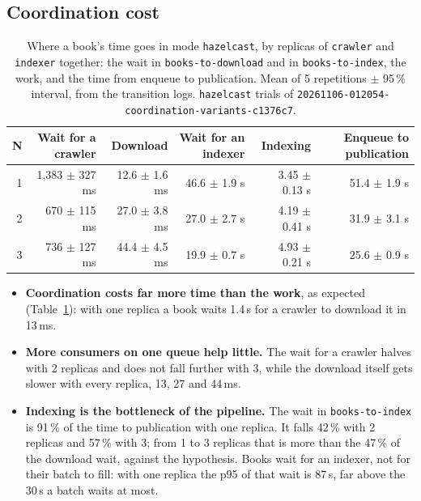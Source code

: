 \documentclass[11pt,a4paper]{article}
\newcommand{\code}[1]{\nolinkurl{#1}}
\newcommand{\mode}[1]{\code{#1}}
\newcommand{\run}[1]{\nolinkurl{#1}}
\begin{document}
\subsection{Coordination cost}
\label{sec:coordcost}

\begin{table}[ht]
\centering
\small
\caption{Where a book's time goes in mode \mode{hazelcast}, by replicas of \code{crawler} and \code{indexer} together:
the wait in \code{books-to-download} and in \code{books-to-index}, the work, and the time from enqueue to publication.
Mean of 5 repetitions $\pm$ 95\,\% interval,
from the transition logs. \mode{hazelcast} trials of \run{20261106-012054-coordination-variants-c1376c7}.}
\label{tab:coordination}
\footnotesize
\setlength{\tabcolsep}{4pt}
\begin{tabular}{@{}rrrrrr@{}}
\toprule
N & Wait for a crawler & Download & Wait for an indexer & Indexing & Enqueue to publication \\
\midrule
1 & 1{,}383 $\pm$ 327 ms & 12.6 $\pm$ 1.6 ms & 46.6 $\pm$ 1.9 s & 3.45 $\pm$ 0.13 s & 51.4 $\pm$ 1.9 s \\
2 & 670 $\pm$ 115 ms & 27.0 $\pm$ 3.8 ms & 27.0 $\pm$ 2.7 s & 4.19 $\pm$ 0.41 s & 31.9 $\pm$ 3.1 s \\
3 & 736 $\pm$ 127 ms & 44.4 $\pm$ 4.5 ms & 19.9 $\pm$ 0.7 s & 4.93 $\pm$ 0.21 s & 25.6 $\pm$ 0.9 s \\
\bottomrule
\end{tabular}
\end{table}

\begin{itemize}
\item \textbf{Coordination costs far more time than the work}, as expected (Table~\ref{tab:coordination}): with one
  replica a book waits 1.4\,s for a crawler to download it in 13\,ms.
\item \textbf{More consumers on one queue help little.} The wait for a crawler halves with 2 replicas and does not fall
  further with 3, while the download itself gets slower with every replica, 13, 27 and 44\,ms.
\item \textbf{Indexing is the bottleneck of the pipeline.} The wait in \code{books-to-index} is 91\,\% of the time to
  publication with one replica. It falls 42\,\% with 2 replicas and 57\,\% with 3; from 1 to 3 replicas that is more
  than the 47\,\% of the download wait, against the hypothesis. Books wait for an indexer, not for their batch to fill: with one replica the p95 of that wait is
  87\,s, far above the 30\,s a batch waits at most.
\end{itemize}
\end{document}
